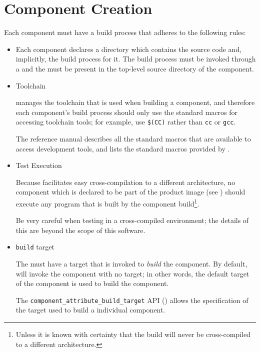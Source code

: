 \section{Component \makefile Creation}\label{wrap:component-makefile}

Each component must have a build process that adheres to the following
rules:

\begin{itemize}
\item \makefile

  Each component declares a directory which contains the source code
  and, implicitly, the build process for it.  The build process must
  be invoked through a \makefile and the \makefile must be present in
  the top-level source directory of the component.

\item Toolchain

  \lmsbw manages the toolchain that is used when building a component,
  and therefore each component's build process should only use the
  standard macros for accessing toolchain tools; for example, use
  \texttt{\$(CC)} rather than \texttt{cc} or \texttt{gcc}.

  The \gnumake reference manual describes all the standard macros that
  are available to access development tools, and
   lists the standard macros provided
  by \lmsbw.

\item Test Execution

  Because \lmsbw facilitates easy cross-compilation to a different
  architecture, no component which is declared to be part of the
  product image (see ) should execute any
  program that is built by the component build\footnote{Unless it is
    known with certainty that the build will never be cross-compiled
    to a different architecture.}.

  Be very careful when testing in a cross-compiled environment; the
  details of this are beyond the scope of this software.

\item \texttt{build} target

  The \makefile must have a target that is invoked to \emph{build} the
  component.  By default, \lmsbw will invoke the component \makefile
  with no target; in other words, the default target of the component
  \makefile is used to build the component.

  The \texttt{component\_attribute\_build\_target} API
  () allows the
  specification of the target used to build a individual component.


\end{itemize}
